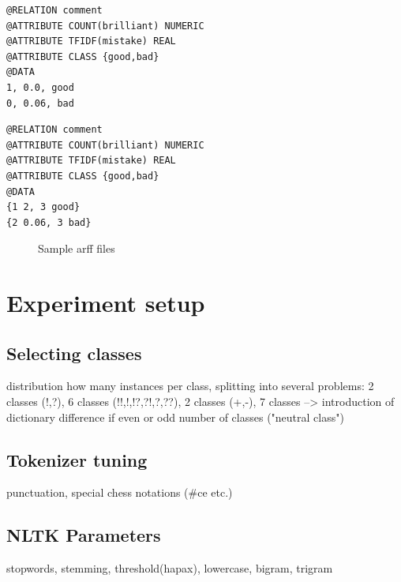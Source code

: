 \documentclass[article,type=msc,colorback,accentcolor=tud7b]{tudthesis}
\begin{document}
    \newsavebox{\complete}
      \begin{lrbox}{\complete}
        \begin{lstlisting}
@RELATION comment
@ATTRIBUTE COUNT(brilliant) NUMERIC
@ATTRIBUTE TFIDF(mistake) REAL
@ATTRIBUTE CLASS {good,bad}
@DATA
1, 0.0, good
0, 0.06, bad	  
        \end{lstlisting}
      \end{lrbox}
    \newsavebox{\sparse}
      \begin{lrbox}{\sparse}
        \begin{lstlisting}
@RELATION comment
@ATTRIBUTE COUNT(brilliant) NUMERIC
@ATTRIBUTE TFIDF(mistake) REAL
@ATTRIBUTE CLASS {good,bad}
@DATA
{1 2, 3 good}
{2 0.06, 3 bad}	  
        \end{lstlisting}
      \end{lrbox}    
    
    \begin{figure}[H]
	  \centering      
	  \subfloat[complete]{\usebox{\complete}}
	  \quad
	  \subfloat[sparse]{\usebox{\sparse}}
      \caption{Sample arff files}
      \label{fig:sample_arff_files}
	\end{figure}
  \clearpage
  
  \section{Experiment setup}
  
  \subsection{Selecting classes}
    distribution how many instances per class, splitting into several problems: 2 classes (!,?), 6 classes (!!,!,!?,?!,?,??), 2 classes (+,-), 7 classes --> introduction of dictionary
    difference if even or odd number of classes ("neutral class")
    
  \subsection{Tokenizer tuning}
    punctuation, special chess notations (\#ce etc.)
    
  \subsection{NLTK Parameters}
    stopwords, stemming, threshold(hapax), lowercase, bigram, trigram
\end{document}
